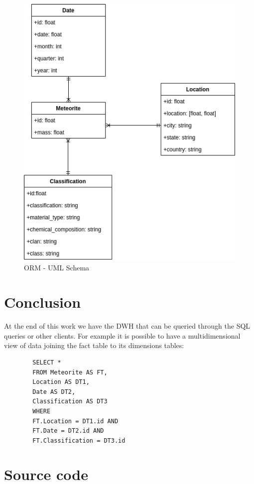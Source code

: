 \documentclass[conference]{IEEEtran}
\begin{document}
	\begin{figure}[htpb]
		\centering
		\includegraphics[width=\columnwidth]{images/uml_schema.png}
		\caption{ORM - UML Schema}
		\label{fig: ORM_mapping}
	\end{figure}
		
	\section{Conclusion}
	At the end of this work we have the DWH that can be queried through the SQL queries or other clients. For example it is possible to have a multidimensional view of data joining the fact table to its dimensions tables:\\
	\begin{verbatim}
		SELECT *
		FROM Meteorite AS FT, 
		Location AS DT1, 
		Date AS DT2, 
		Classification AS DT3
		WHERE 
		FT.Location = DT1.id AND 
		FT.Date = DT2.id AND
		FT.Classification = DT3.id
	\end{verbatim}
	
	
	\section{Source code}
	
\end{document}
